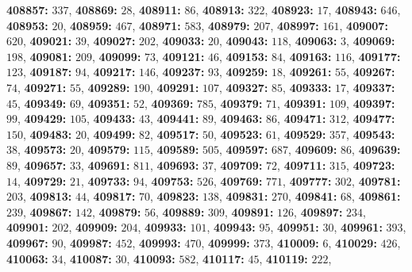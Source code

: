 \textsf{\bfseries 408857:} $337$, \textsf{\bfseries 408869:} $28$, \textsf{\bfseries 408911:} $86$, \textsf{\bfseries 408913:} $322$, \textsf{\bfseries 408923:} $17$, \textsf{\bfseries 408943:} $646$, \textsf{\bfseries 408953:} $20$, \textsf{\bfseries 408959:} $467$, \textsf{\bfseries 408971:} $583$, \textsf{\bfseries 408979:} $207$, \textsf{\bfseries 408997:} $161$, \textsf{\bfseries 409007:} $620$, \textsf{\bfseries 409021:} $39$, \textsf{\bfseries 409027:} $202$, \textsf{\bfseries 409033:} $20$, \textsf{\bfseries 409043:} $118$, \textsf{\bfseries 409063:} $3$, \textsf{\bfseries 409069:} $198$, \textsf{\bfseries 409081:} $209$, \textsf{\bfseries 409099:} $73$, \textsf{\bfseries 409121:} $46$, \textsf{\bfseries 409153:} $84$, \textsf{\bfseries 409163:} $116$, \textsf{\bfseries 409177:} $123$, \textsf{\bfseries 409187:} $94$, \textsf{\bfseries 409217:} $146$, \textsf{\bfseries 409237:} $93$, \textsf{\bfseries 409259:} $18$, \textsf{\bfseries 409261:} $55$, \textsf{\bfseries 409267:} $74$, \textsf{\bfseries 409271:} $55$, \textsf{\bfseries 409289:} $190$, \textsf{\bfseries 409291:} $107$, \textsf{\bfseries 409327:} $85$, \textsf{\bfseries 409333:} $17$, \textsf{\bfseries 409337:} $45$, \textsf{\bfseries 409349:} $69$, \textsf{\bfseries 409351:} $52$, \textsf{\bfseries 409369:} $785$, \textsf{\bfseries 409379:} $71$, \textsf{\bfseries 409391:} $109$, \textsf{\bfseries 409397:} $99$, \textsf{\bfseries 409429:} $105$, \textsf{\bfseries 409433:} $43$, \textsf{\bfseries 409441:} $89$, \textsf{\bfseries 409463:} $86$, \textsf{\bfseries 409471:} $312$, \textsf{\bfseries 409477:} $150$, \textsf{\bfseries 409483:} $20$, \textsf{\bfseries 409499:} $82$, \textsf{\bfseries 409517:} $50$, \textsf{\bfseries 409523:} $61$, \textsf{\bfseries 409529:} $357$, \textsf{\bfseries 409543:} $38$, \textsf{\bfseries 409573:} $20$, \textsf{\bfseries 409579:} $115$, \textsf{\bfseries 409589:} $505$, \textsf{\bfseries 409597:} $687$, \textsf{\bfseries 409609:} $86$, \textsf{\bfseries 409639:} $89$, \textsf{\bfseries 409657:} $33$, \textsf{\bfseries 409691:} $811$, \textsf{\bfseries 409693:} $37$, \textsf{\bfseries 409709:} $72$, \textsf{\bfseries 409711:} $315$, \textsf{\bfseries 409723:} $14$, \textsf{\bfseries 409729:} $21$, \textsf{\bfseries 409733:} $94$, \textsf{\bfseries 409753:} $526$, \textsf{\bfseries 409769:} $771$, \textsf{\bfseries 409777:} $302$, \textsf{\bfseries 409781:} $203$, \textsf{\bfseries 409813:} $44$, \textsf{\bfseries 409817:} $70$, \textsf{\bfseries 409823:} $138$, \textsf{\bfseries 409831:} $270$, \textsf{\bfseries 409841:} $68$, \textsf{\bfseries 409861:} $239$, \textsf{\bfseries 409867:} $142$, \textsf{\bfseries 409879:} $56$, \textsf{\bfseries 409889:} $309$, \textsf{\bfseries 409891:} $126$, \textsf{\bfseries 409897:} $234$, \textsf{\bfseries 409901:} $202$, \textsf{\bfseries 409909:} $204$, \textsf{\bfseries 409933:} $101$, \textsf{\bfseries 409943:} $95$, \textsf{\bfseries 409951:} $30$, \textsf{\bfseries 409961:} $393$, \textsf{\bfseries 409967:} $90$, \textsf{\bfseries 409987:} $452$, \textsf{\bfseries 409993:} $470$, \textsf{\bfseries 409999:} $373$, \textsf{\bfseries 410009:} $6$, \textsf{\bfseries 410029:} $426$, \textsf{\bfseries 410063:} $34$, \textsf{\bfseries 410087:} $30$, \textsf{\bfseries 410093:} $582$, \textsf{\bfseries 410117:} $45$, \textsf{\bfseries 410119:} $222$, 

